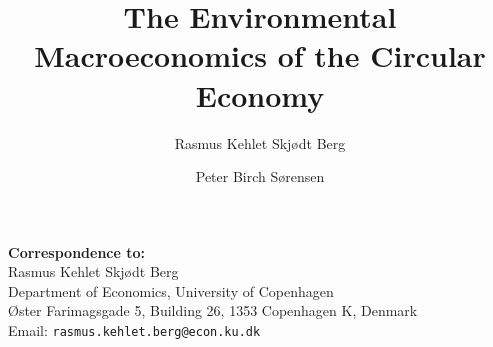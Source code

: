 \documentclass[a4paper]{article}
\title{The Environmental Macroeconomics of the Circular Economy}
\author{Rasmus Kehlet Skjødt Berg
\and 
Peter Birch Sørensen
}
\begin{document}
\maketitle



\vfill
\begin{center}
\textbf{Correspondence to:} \\
Rasmus Kehlet Skjødt Berg \\
Department of Economics, University of Copenhagen \\
Øster Farimagsgade 5, Building 26, 1353 Copenhagen K, Denmark \\
Email: \texttt{rasmus.kehlet.berg@econ.ku.dk}
\end{center}













\clearpage
\printbibliography[
heading=bibintoc,
title={References},
category=cited]



\clearpage
\begin{appendices}
\setcounter{page}{1}
\renewcommand{\theequation}{\thesection.\arabic{equation}}
\end{appendices}
\end{document}
